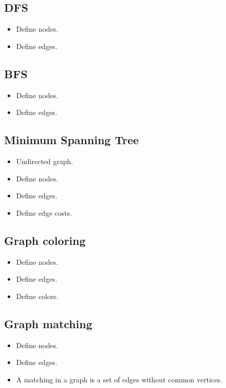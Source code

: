 \documentclass[guide.tex]{subfiles}
\begin{document}
\subsection{DFS}
\begin{itemize}
  \item Define nodes.
  \item Define edges.
\end{itemize}

\subsection{BFS}
\begin{itemize}
  \item Define nodes.
  \item Define edges.
\end{itemize}

\subsection{Minimum Spanning Tree}
\begin{itemize}
  \item Undirected graph.
  \item Define nodes.
  \item Define edges.
  \item Define edge costs.
\end{itemize}

\subsection{Graph coloring}
\begin{itemize}
  \item Define nodes.
  \item Define edges.
  \item Define colors.
\end{itemize}

\subsection{Graph matching}
\begin{itemize}
  \item Define nodes.
  \item Define edges.
  \item A matching in a graph is a set of edges without common vertices.
\end{itemize}
\end{document}
